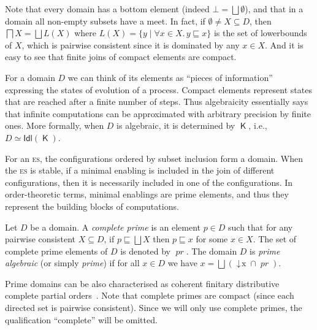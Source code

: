 \documentclass[conference]{IEEEtran}
\newcommand{\compact}[1]{\ensuremath{\mathop{\mathsf{K}({#1})}}}
\newcommand{\principal}[1]{\ensuremath{\mathop{\downarrow\!{#1}}}}
\newcommand{\ideal}[1]{\ensuremath{\mathsf{Idl}({#1})}}
\newcommand{\pr}[1]{\ensuremath{\mathop{\mathit{pr}({#1})}}}
\newcommand{\esabbr}{\textsc{es}}
\begin{document}
Note that every domain has a bottom element (indeed $\bot = \bigsqcup \emptyset$), and that
in a domain all non-empty subsets have a meet. In fact, if
$\emptyset \neq X \subseteq D$, then $\bigsqcap X = \bigsqcup L(X)$
where $L(X) = \{ y \mid \forall x \in X.\, y \sqsubseteq x\}$ is the
set of lowerbounds of $X$, which is pairwise consistent since it is
dominated by any $x \in X$. And it is easy to see that finite joins of 
compact elements are compact.

For a domain $D$ we can think of its elements as ``pieces of
information'' expressing the states of evolution of a process. Compact
elements represent states that are reached after a finite number of
steps.  Thus algebraicity essentially says that infinite
computations can be approximated with arbitrary precision by finite
ones. More formally, when $D$ is algebraic, it is determined by
$\compact{D}$, i.e., $D \simeq \ideal{\compact{D}}$.

For an {\esabbr}, the configurations ordered by subset inclusion form
a domain. When the {\esabbr} is stable, if a minimal
enabling is included in the join of different configurations, then it is necessarily included in one of the configurations. In
order-theoretic terms, minimal enablings are prime elements, and thus
they represent the building blocks of computations.

\begin{definition} Let $D$ be a domain.
  A \emph{complete prime} is an element $p \in D$
  such that for any pairwise consistent $X \subseteq D$, if
  $p \sqsubseteq \bigsqcup X$ then $p \sqsubseteq x$ for some
  $x \in X$.
  The set of complete prime elements of $D$ is denoted by $\pr{D}$. 
  The domain $D$ is \emph{prime algebraic} (or simply \emph{prime}) 
  if for all $x \in D$ we have
  $x = \bigsqcup (\principal{x} \cap \pr{D})$.
\end{definition}

Prime domains can be also characterised as coherent finitary distributive complete partial orders~\cite{Win:ES}.
%
Note that complete primes are compact (since each directed set is pairwise
consistent). Since we will only use complete primes, the qualification ``complete'' will be omitted.
\end{document}
